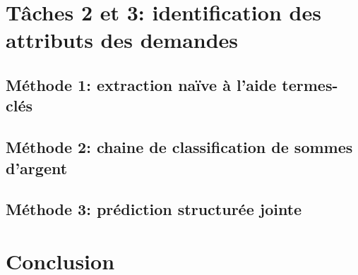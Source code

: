 \section{Tâches 2 et 3: identification des attributs des demandes}
\label{sec:quanta:attributs}

\subsection{Méthode 1: extraction naïve à l'aide termes-clés}
\label{subsec:quanta:attributs:règles}


\subsection{Méthode 2: chaine de classification de sommes d'argent}


\subsection{Méthode 3: prédiction structurée jointe}


\section{Conclusion}
\label{sec:quanta:conclusion}

